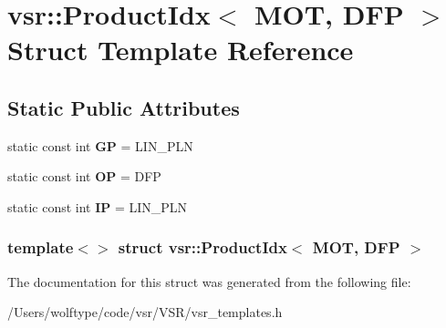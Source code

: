 \hypertarget{structvsr_1_1_product_idx_3_01_m_o_t_00_01_d_f_p_01_4}{\section{vsr\-:\-:Product\-Idx$<$ M\-O\-T, D\-F\-P $>$ Struct Template Reference}
\label{structvsr_1_1_product_idx_3_01_m_o_t_00_01_d_f_p_01_4}
}
\subsection*{Static Public Attributes}
\begin{DoxyCompactItemize}
\item 
\hypertarget{structvsr_1_1_product_idx_3_01_m_o_t_00_01_d_f_p_01_4_adde8e74ab52d9a65dbac119f1257bfef}{static const int {\bfseries G\-P} = L\-I\-N\-\_\-\-P\-L\-N}\label{structvsr_1_1_product_idx_3_01_m_o_t_00_01_d_f_p_01_4_adde8e74ab52d9a65dbac119f1257bfef}

\item 
\hypertarget{structvsr_1_1_product_idx_3_01_m_o_t_00_01_d_f_p_01_4_a141d89b544de496f36f37e5c605c88fc}{static const int {\bfseries O\-P} = D\-F\-P}\label{structvsr_1_1_product_idx_3_01_m_o_t_00_01_d_f_p_01_4_a141d89b544de496f36f37e5c605c88fc}

\item 
\hypertarget{structvsr_1_1_product_idx_3_01_m_o_t_00_01_d_f_p_01_4_a2d4ffca1dfb5f4ff584c9acc5ff5bcaa}{static const int {\bfseries I\-P} = L\-I\-N\-\_\-\-P\-L\-N}\label{structvsr_1_1_product_idx_3_01_m_o_t_00_01_d_f_p_01_4_a2d4ffca1dfb5f4ff584c9acc5ff5bcaa}

\end{DoxyCompactItemize}
\subsubsection*{template$<$$>$ struct vsr\-::\-Product\-Idx$<$ M\-O\-T, D\-F\-P $>$}



The documentation for this struct was generated from the following file\-:\begin{DoxyCompactItemize}
\item 
/\-Users/wolftype/code/vsr/\-V\-S\-R/vsr\-\_\-templates.\-h\end{DoxyCompactItemize}
